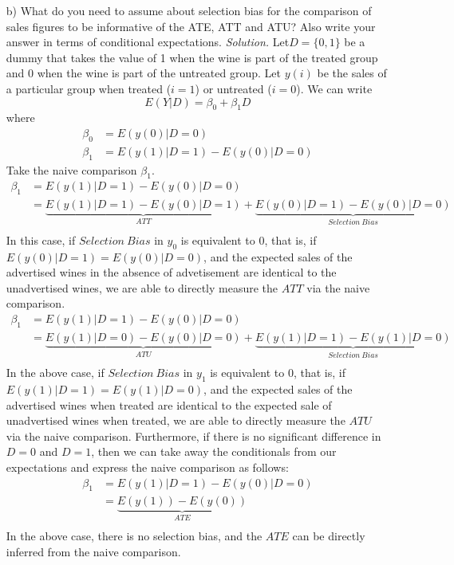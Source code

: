 \documentclass[
]{article}
\begin{document}
\begin{enumerate}
\item[b)] What do you need to assume about selection bias for the comparison of sales figures to be informative of the ATE, ATT and ATU? Also write your answer in terms of conditional expectations.
\newline
\newline
\textit{Solution.}
\newline
Let$D=\{0,1\}$ be a dummy that takes the value of 1 when the wine is part of the treated group and 0 when the wine is part of the untreated group. Let $y(i)$ be the sales of a particular group when treated ($i = 1$) or untreated ($i = 0$). We can write 
\[E(Y|D)= \beta_0 + \beta_1 D\]
where 
\[\begin{aligned}
\beta_0 &= E(y(0)|D=0) \\
\beta_1 &= E(y(1)|D=1) - E(y(0)|D=0)
\end{aligned}\]
Take the naive comparison $\beta_1$. 
\[\begin{aligned}
\beta_1 &= E(y(1)|D=1) - E(y(0)|D=0) \\
&= \underbrace{E(y(1)|D=1) - E(y(0)|D=1)}_{ATT} +  \underbrace{E(y(0)|D=1)- E(y(0)|D=0)}_{Selection \: Bias} \\
\end{aligned}\]
In this case, if $Selection \: Bias$ in $y_0$ is equivalent to 0, that is, if $E(y(0)|D=1)= E(y(0)|D=0)$, and the expected sales of the advertised wines in the absence of advetisement are identical to the unadvertised wines, we are able to directly measure the $ATT$ via the naive comparison.  
\[\begin{aligned}
\beta_1 &= E(y(1)|D=1) - E(y(0)|D=0) \\
&= \underbrace{E(y(1)|D=0)- E(y(0)|D=0)}_{ATU}+ \underbrace{E(y(1)|D=1) - E(y(1)|D=0)}_{Selection \: Bias} \\
\end{aligned}\]
In the above case, if $Selection \: Bias$ in $y_1$ is equivalent to 0, that is, if $E(y(1)|D=1) = E(y(1)|D=0)$, and the expected sales of the advertised wines when treated are identical to the expected sale of unadvertised wines when treated, we are able to directly measure the $ATU$ via the naive comparison.\newline
Furthermore, if there is no significant difference in $D=0$ and $D=1$, then we can take away the conditionals from our expectations and express the naive comparison as follows:
\[\begin{aligned}
\beta_1 &= E(y(1)|D=1) - E(y(0)|D=0) \\
&= \underbrace{E(y(1))- E(y(0))}_{ATE} \\
\end{aligned}\]
In the above case, there is no selection bias, and the $ATE$ can be directly inferred from the naive comparison. 


\end{enumerate}
\end{document}
